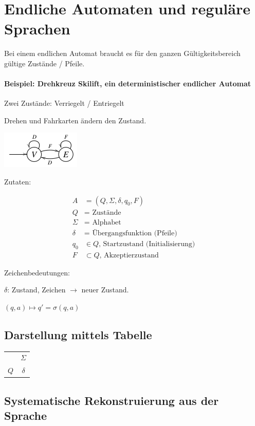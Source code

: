 \section{Endliche Automaten und reguläre Sprachen}

Bei einem endlichen Automat braucht es für den ganzen Gültigkeitsbereich gültige Zustände / Pfeile.

\paragraph{Beispiel: Drehkreuz Skilift, ein deterministischer endlicher Automat}

	Zwei Zustände: Verriegelt / Entriegelt
	
	Drehen und Fahrkarten ändern den Zustand.
	
	\includegraphics[scale=0.5]{img/skilift.png}

Zutaten: 

\begin{align*}
	A	&= (Q, \Sigma, \delta, q_0, F)  \\
	Q	&= \text{ Zustände} \\
	\Sigma	&= \text{ Alphabet} \\
	\delta	&= \text{ Übergangsfunktion (Pfeile)} \\
	q_0	&\in Q \text{, Startzustand (Initialisierung)} \\
	F	&\subset Q \text{, Akzeptierzustand}
\end{align*}

Zeichenbedeutungen:

$\delta$: Zustand, Zeichen $\rightarrow$ neuer Zustand.

$(q, a) \mapsto q'=\sigma(q,a)$


\subsection{Darstellung mittels Tabelle}

\begin{tabular}{c c}
 & $\Sigma$ \\
$Q$	& $\delta$
\end{tabular}

\subsection{Systematische Rekonstruierung aus der Sprache}


